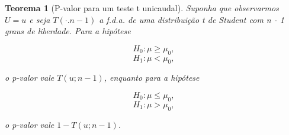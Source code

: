 \documentclass{article}
\newtheorem{theorem}{Teorema}
\begin{document}
\begin{theorem}[P-valor para um teste t unicaudal]
Suponha que observarmos $U = u$ e seja $T(\cdot. n - 1)$ a f.d.a. de uma distribuição t de Student com n - 1 graus de liberdade. Para a hipótese

$$H_0 : \mu \geq \mu_0,$$
$$H_1 : \mu < \mu_0,$$

o p-valor vale $T(u; n-1)$, enquanto para a hipótese

$$H_0 : \mu \leq \mu_0,$$
$$H_1 : \mu > \mu_0,$$

o p-valor vale $1 - T(u; n-1)$.
\end{theorem}
\end{document}
